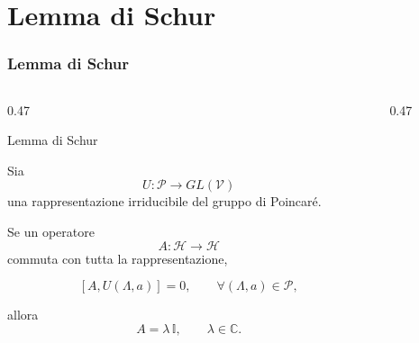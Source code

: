 \documentclass[11pt,t,aspectratio=169]{beamer}
\begin{document}
\section{Lemma di Schur}

\begin{frame}[t]
    \frametitle{Lemma di Schur}
    \vspace{-0.7cm}

    \begin{columns}[T,onlytextwidth]


        \begin{column}{0.47\textwidth}

            \begin{block}{Lemma di Schur}

                \begin{minipage}[t][0.78\textheight][t]{\linewidth}

                    Sia
                    \[
                    U:\mathcal P\longrightarrow GL(\mathcal V)
                    \]
                    una rappresentazione irriducibile del
                    gruppo di Poincaré.

                    Se un operatore
                    \[
                        A:\mathcal H\longrightarrow\mathcal H
                    \]
                    commuta con tutta la rappresentazione,

                    \[
                        [A,U(\Lambda,a)]=0,
                        \qquad
                        \forall(\Lambda,a)\in\mathcal P,
                    \]

                    allora
\[
    A=\lambda\,\mathbb I,
    \qquad \lambda\in\mathbb C.
\]

                \end{minipage}

            \end{block}

        \end{column}

        \hfill


        \begin{column}{0.47\textwidth}


\end{column}
\end{columns}
\end{frame}
\end{document}
